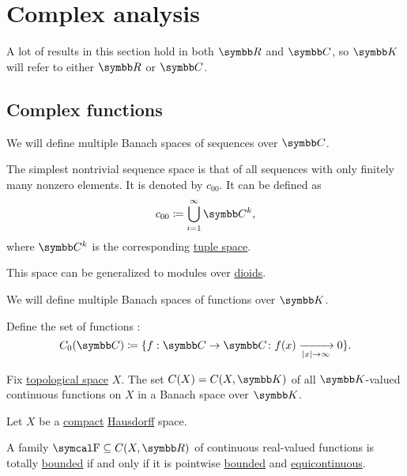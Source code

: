 \section{Complex analysis}\label{sec:complex_analysis}

A lot of results in this section hold in both \( \BR \) and \( \BC \), so \( \BK \) will refer to either \( \BR \) or \( \BC \).

\subsection{Complex functions}\label{subsec:complex_functions}

\begin{definition}\label{def:sequence_spaces}
  We will define multiple Banach spaces of sequences over \( \BC \).

  \begin{DefEnum}
     The simplest nontrivial sequence space is that of all sequences with only finitely many nonzero elements. It is denoted by \( c_{00} \). It can be defined as
    \begin{equation*}
      c_{00} \coloneqq \bigcup_{i=1}^\infty \BC^k,
    \end{equation*}
    where \( \BC^k \) is the corresponding \hyperref[def:left_module_of_tuples]{tuple space}.

    This space can be generalized to modules over \hyperref[def:left_module]{dioids}.
  \end{DefEnum}
\end{definition}

\begin{definition}\label{def:function_spaces}
  We will define multiple Banach spaces of functions over \( \BK \).

  \begin{DefEnum}
     Define the set of functions :
    \begin{equation*}
      C_0(\BC) \coloneqq \{ f: \BC \to \BC \colon f(x) \xrightarrow[\Abs{x} \to \infty]{} 0 \}.
    \end{equation*}

     Fix \hyperref[def:topological_space]{topological space} \( X \). The set \( C(X) = C(X, \BK) \) of all \( \BK \)-valued continuous functions on \( X \) in a Banach space over \( \BK \).
  \end{DefEnum}
\end{definition}

\begin{theorem}\label{thm:arzela_ascoli}
  Let \( X \) be a \hyperref[def:compact_space]{compact} \hyperref[def:separation_axioms/T2]{Hausdorff} space.

  A family \( \CF \subseteq C(X, \BR) \) of continuous real-valued functions is totally \hyperref[def:totally_bounded_set]{bounded} if and only if it is pointwise \hyperref[def:bounded_function/pointwise]{bounded} and \hyperref[def:function_set_continuity/equicontinuous]{equicontinuous}.
\end{theorem}

